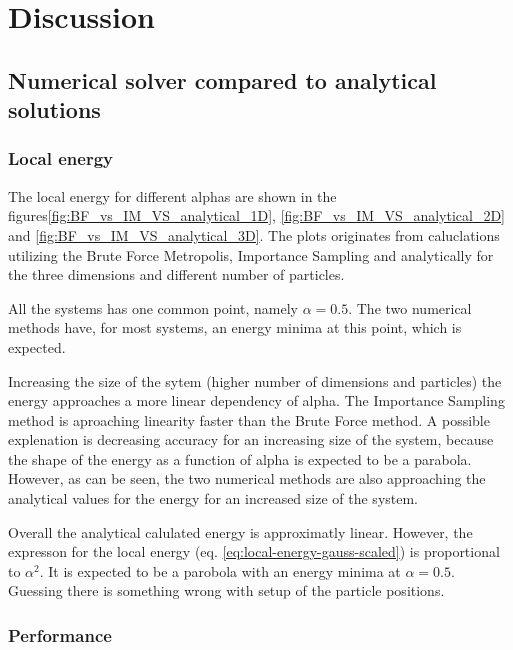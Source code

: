 \documentclass[
]{article}
\begin{document}
\hypertarget{discussion}{%
\section{Discussion}\label{discussion}}

\hypertarget{numerical-solver-compared-to-analytical-solutions}{%
\subsection*{Numerical solver compared to analytical
solutions}\label{numerical-solver-compared-to-analytical-solutions}}

\hypertarget{local-energy}{%
\subsubsection{Local energy}\label{local-energy}}

The local energy for different alphas are shown in the
figures\ref{fig:BF_vs_IM_VS_analytical_1D},
\ref{fig:BF_vs_IM_VS_analytical_2D} and
\ref{fig:BF_vs_IM_VS_analytical_3D}. The plots originates from
caluclations utilizing the Brute Force Metropolis, Importance Sampling
and analytically for the three dimensions and different number of
particles.

All the systems has one common point, namely \(\alpha = 0.5\). The two
numerical methods have, for most systems, an energy minima at this
point, which is expected.

Increasing the size of the sytem (higher number of dimensions and
particles) the energy approaches a more linear dependency of alpha. The
Importance Sampling method is aproaching linearity faster than the Brute
Force method. A possible explenation is decreasing accuracy for an
increasing size of the system, because the shape of the energy as a
function of alpha is expected to be a parabola. However, as can be seen,
the two numerical methods are also approaching the analytical values for
the energy for an increased size of the system.

Overall the analytical calulated energy is approximatly linear. However,
the expresson for the local energy (eq.
\eqref{eq:local-energy-gauss-scaled}) is proportional to \(\alpha^2\).
It is expected to be a parobola with an energy minima at
\(\alpha = 0.5\). Guessing there is something wrong with setup of the
particle positions.

\hypertarget{performance}{%
\subsubsection*{Performance}\label{performance}}
\end{document}
